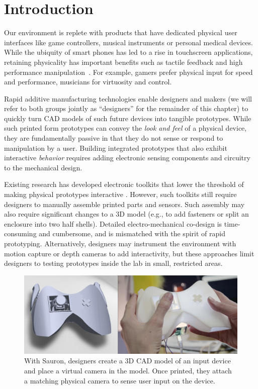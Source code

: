 \section{Introduction}

Our environment is replete with products that have dedicated physical user interfaces like game controllers, musical instruments or personal medical devices. While the ubiquity of smart phones has led to a rise in touchscreen applications, retaining physicality has important benefits such as tactile feedback and high performance manipulation~\cite{klemmer-bodies}. For example, gamers prefer physical input for speed and performance, musicians for virtuosity and control.

Rapid additive manufacturing technologies enable designers and makers (we will refer to both groups jointly as ``designers'' for the remainder of this chapter) to quickly turn CAD models of such future devices into tangible prototypes. While such printed form prototypes can convey the {\em look and feel} of a physical device, they are fundamentally passive in that they do not sense or respond to manipulation by a user. Building integrated prototypes that also exhibit interactive {\em behavior} requires adding electronic sensing components and circuitry to the mechanical design. 

Existing research has developed electronic toolkits that lower the threshold of making physical prototypes interactive \cite{arduino, greenberg-phidgets, hartmann-dtools}.
However, such toolkits still require designers to manually assemble printed parts and sensors. Such assembly may also require significant changes to a 3D model (e.g., to add fasteners or split an enclosure into two half shells). Detailed electro-mechanical co-design is time-consuming and cumbersome, and is mismatched with the spirit of rapid prototyping. Alternatively, designers may instrument the environment with motion capture \cite{akaoka-displayobjects} or depth cameras \cite{wilson-depthtouch} to add interactivity, but these approaches limit designers to testing prototypes inside the lab in small, restricted areas.

\begin{figure}
\centering
\includegraphics[width=1.0\columnwidth]{figures/sauron/fig1-gamecontroller.jpg}
\caption{With Sauron, designers create a 3D CAD model of an input device and place a virtual camera in the model. Once printed, they attach a matching physical camera to sense user input on the device.}
\label{fig:sauron-teaser}
\end{figure}


